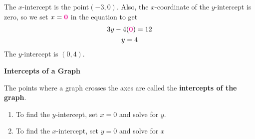 \documentclass[10pt,]{book}
\newcommand{\terminology}[1]{\textbf{#1}}
\theoremstyle{plain}
\theoremstyle{definition}
\theoremstyle{definition}
\theoremstyle{definition}
\theoremstyle{definition}
\numberwithin{equation}{section}
\newcommand{\alert}[1]{\mathbf{\color{magenta}{#1}}}
\begin{document}
The \(x\)-intercept is the point\((-3,0)\). Also, the \(x\)-coordinate of the \(y\)-intercept is zero, so we set \(x=\alert{0}\) in the equation to get \begin{gather*}
3y-4(\alert{0})=12\\
y=4
\end{gather*}  The \(y\)-intercept is \((0,4)\).%
\begin{mdframed}[style=assemblage]%
\noindent\textbf{\large Intercepts of a Graph}\label{assemblage-2}\par\medskip
The points where a graph crosses the axes are called the \terminology{intercepts of the graph}.
        \leavevmode%
\begin{enumerate}
\item\hypertarget{li-52}{}To find the \(y\)-intercept, set \(x=0\) and solve for \(y\).%
\item\hypertarget{li-53}{}To find the \(x\)-intercept, set \(y=0\) and solve for \(x\)%
\end{enumerate}
%
\end{mdframed}
\par
\end{document}
